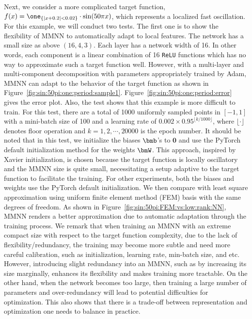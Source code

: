 \documentclass[review,hidelinks,onefignum,onetabnum]{siamart250211}
\begin{document}
Next, we consider a more complicated target function, $f(x) = \one_{\{|x+0.2| < 0.02\}} \cdot \sin(50\pi x)$, which represents a localized fast oscillation.
 For this example, we will conduct two tests. The first one is to show the flexibility of MMNN to automatically adapt to local features. The network has a small size as above $(16, 4, 3)$. Each layer has a network width of 16. In other words, each component is a linear combination of 16 \texttt{ReLU} functions which has no way to approximate such a target function well. However, with a multi-layer and multi-component decomposition with parameters appropriately trained by Adam, MMNN can adapt to the behavior of the target function as shown in Figure~\ref{fig:sin:50pi:one:period:sample1}. Figure~\ref{fig:sin:50pi:one:period:error} gives the error plot. Also, the test shows that this example is more difficult to train.  For this test, there are a total of 1000 uniformly sampled points in $[-1,1]$ with a mini-batch size of 100 and a learning rate of $0.002\times 0.95^{\lfloor k/1000 \rfloor}$, where $\lfloor \cdot \rfloor$ denotes floor operation and $k=1,2,\cdots,20000$ is the epoch number. 
It should be noted that in this test, we initialize the biases $\bmb$'s to $\bm{0}$ and use the PyTorch default initialization method for the weights $\bmW$. This approach, inspired by Xavier initialization, is chosen because the target function is locally oscillatory 
and the MMNN size is quite small, necessitating a setup adaptive to the target function to facilitate the training. For other experiments, both the biases and weights use the PyTorch default initialization.
We then compare with least square approximation using uniform finite element method (FEM) basis with the same degrees of freedom. As shown in Figure~\ref{fig:sin:50pi:FEM:vs:low:rank:NN}, MMNN renders a better approximation due to automatic adaptation through the training process. 
We remark that when training an MMNN with an extreme compact size with respect to the target function complexity, due to the lack of flexibility/redundancy, the training may become more subtle and need more careful calibration, such as initialization, learning rate, min-batch size, and etc. 
However, introducing slight redundancy into an MMNN, such as by increasing its size marginally, enhances its flexibility and makes training more tractable.
On the other hand, when the network becomes too large, then training a large number of parameters and over-redundancy will lead to potential difficulties for optimization. This also shows that there is a trade-off between representation and optimization one needs to balance in practice.
\end{document}
